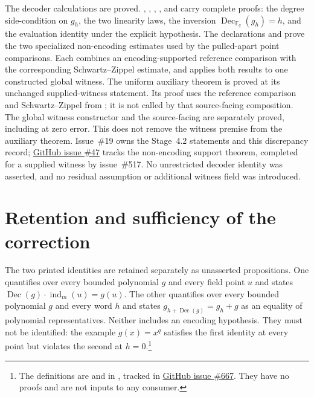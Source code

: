 \documentclass[11pt]{article}
\renewcommand{\ghissue}[1]{%
  \href{https://github.com/Dengnifer/MIPStarRE-QPBT/issues/#1}{GitHub issue \##1}}
\begin{document}
The decoder calculations are proved.  ,
, , ,
and  carry complete proofs: the degree
side-condition on $g_h$, the two linearity laws, the inversion
$\operatorname{Dec}_{\mathbb F_q}(g_h)=h$, and the evaluation identity under the
explicit  hypothesis.  The declarations
 and
 prove the two specialized
non-encoding estimates used by the pulled-apart point comparisons.  Each combines
an encoding-supported reference comparison with the corresponding
Schwartz--Zippel estimate, and  applies both
results to one constructed global witness.  The uniform auxiliary theorem
 is proved at its unchanged
supplied-witness statement. Its proof uses the reference comparison and
Schwartz--Zippel from
; it is not called by that
source-facing composition. The global witness constructor
 and the source-facing
 are separately proved, including at
zero error. This does not remove the witness premise from the auxiliary
theorem. Issue~\#19 owns the Stage~4.2 statements and this discrepancy
record; \ghissue{47} tracks the non-encoding support theorem, completed for a
supplied witness by issue~\#517.
No unrestricted decoder identity was asserted, and no residual assumption or
additional witness field was introduced.

\section{Retention and sufficiency of the correction}

The two printed identities are retained separately as unasserted propositions.
One quantifies over every bounded polynomial $g$ and every field point $u$ and
states $\operatorname{Dec}(g)\cdot\operatorname{ind}_m(u)=g(u)$.
The other quantifies over every bounded polynomial $g$ and every word $h$ and
states $g_{h+\operatorname{Dec}(g)}=g_h+g$ as an equality of polynomial
representatives.  Neither includes an encoding hypothesis.  They must not be
identified: the example $g(x)=x^q$ satisfies the first identity at every point
but violates the second at $h=0$.\footnote{The definitions are
 and
 in
, tracked in
\ghissue{667}.  They have no proofs and are not inputs to any consumer.}
\end{document}
